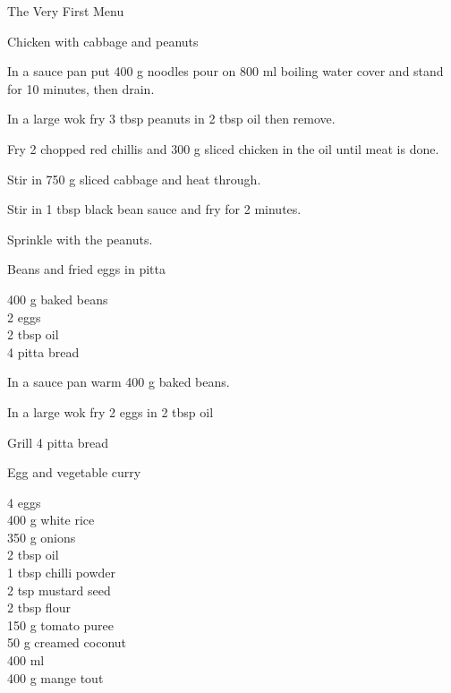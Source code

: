 \begin{menu}{The Very First Menu}
\begin{recipe}{2}{Chicken with cabbage and peanuts}
    \begin{instructions}
    \item 
      In a sauce pan
      put
      400 g  noodles
      pour on
      800 ml  boiling water
      cover and stand for 10 minutes, then drain.
    \item 
        In a large wok	fry
        3 tbsp  peanuts
        in
        2 tbsp  oil
        then remove.
      \item 
        Fry 2  chopped red chillis
        and
        300 g sliced chicken
        in the oil until meat is done.
      \item 
        Stir in
        750 g sliced cabbage
        and heat through.
      \item 
        Stir in
        1 tbsp  black bean sauce
        and fry for 2 minutes.
      \item 
        Sprinkle with the peanuts.
      
    \end{instructions}
    \end{recipe}%
  
    \begin{recipe}{1}{Beans and fried eggs in pitta}%
    
		\begin{ingredients}
		400 g baked beans  \\
	2  eggs  \\
	2 tbsp oil  \\
	4  pitta bread  \\
	
		\end{ingredients}
	
    \begin{instructions}
    \item 
        In a sauce pan warm
        400 g  baked beans.
      \item 
        In a large wok fry
        2   eggs
        in
        2 tbsp  oil\item 
        Grill
        4   pitta bread
    \end{instructions}
    \end{recipe}%
  
    \begin{recipe}{2}{Egg and vegetable curry}%
    
	
		\begin{ingredients}
		4  eggs  \\
	400 g white rice  \\
	350 g onions  \\
	2 tbsp oil  \\
	1 tbsp chilli powder  \\
	2 tsp mustard seed  \\
	2 tbsp flour  \\
	150 g tomato puree  \\
	50 g creamed coconut  \\
	400 ml   \\
	400 g mange tout  \\
	

\end{ingredients}
\end{recipe}
\end{menu}
